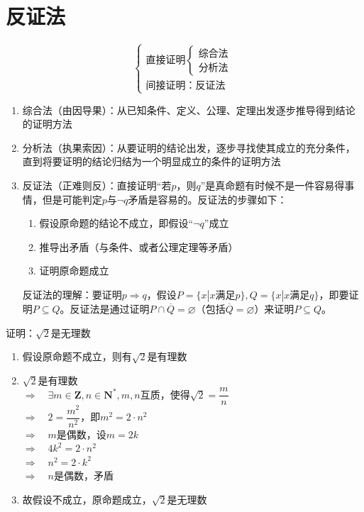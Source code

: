 \section*{反证法}
\begin{equation*}
    \left \{ \begin{array}{l}  
            \mbox{直接证明} \left \{ {
                                  \begin{array}{l}  
                                        \mbox{综合法} \\
                                        \mbox{分析法}
                                   \end{array}
                                  }
                            \right. \\
            \mbox{间接证明：反证法}
         \end{array}\right.
\end{equation*}
\begin{enumerate}
    \item 综合法（由因导果）：从已知条件、定义、公理、定理出发逐步推导得到结论的证明方法
    \item 分析法（执果索因）：从要证明的结论出发，逐步寻找使其成立的充分条件，直到将要证明的结论归结为一个明显成立的条件的证明方法
    \item 反证法（正难则反）：直接证明“若$p$，则$q$”是真命题有时候不是一件容易得事情，但是可能判定$p$与$\neg q$矛盾是容易的。反证法的步骤如下：
        \begin{enumerate}
            \item 假设原命题的结论不成立，即假设“$\neg q$”成立
            \item 推导出矛盾（与条件、或者公理定理等矛盾）
            \item 证明原命题成立
        \end{enumerate}
    反证法的理解：要证明$p \Rightarrow q$，假设$P = \{x | x \mbox{满足}p\}, Q = \{x | x \mbox{满足}q\}$，即要证明$P \subseteq Q$。反证法是通过证明$P \cap \overline{Q} = \varnothing$（包括$\overline{Q} = \varnothing$）来证明$P \subseteq Q$。
\end{enumerate}
\begin{example}
    证明：$\sqrt{2}$是无理数
    \begin{enumerate}
        \item 假设原命题不成立，则有$\sqrt{2}$是有理数
        \item $\sqrt{2}$是有理数 \\
              $\Rightarrow \quad \exists m \in \mathbf{Z}, n \in \mathbf{N^*}, m,n\mbox{互质，使得}\sqrt{2} = \dfrac{m}{n}$ \\
              $\Rightarrow \quad 2 = \dfrac{m^2}{n^2}$，即$m^2 = 2 \cdot n^2$ \\
              $\Rightarrow \quad m$是偶数，设$m = 2k$ \\
              $\Rightarrow \quad 4k^2 = 2 \cdot n^2 $ \\
              $\Rightarrow \quad n^2 = 2 \cdot k^2$ \\
              $\Rightarrow \quad n$是偶数，矛盾
        \item 故假设不成立，原命题成立，$\sqrt{2}$是无理数
    \end{enumerate}
\end{example}
